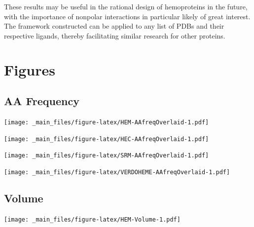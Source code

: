 \documentclass[a4paper, nobind]{templates/ociamthesis}
\let\origfigure\figure
\let\endorigfigure\endfigure
\renewenvironment{figure}[1][2] {
    \expandafter\origfigure\expandafter[H]
} {
    \endorigfigure
}
\begin{document}
These results may be useful in the rational design of hemoproteins in the future, with the importance of nonpolar interactions in particular likely of great interest. The framework constructed can be applied to any list of PDBs and their respective ligands, thereby facilitating similar research for other proteins.

\startappendices

\hypertarget{a-figures}{%
\chapter{Figures}\label{a-figures}}

\minitoc

\hypertarget{figs-aaFreqOverlaid}{%
\section{AA Frequency}\label{figs-aaFreqOverlaid}}

\begin{figure}
\centering
\texttt{[image: \_main\_files/figure-latex/HEM-AAfreqOverlaid-1.pdf]}
\caption{\label{fig:HEM-AAfreqOverlaid}HEM: AA Frequency}
\end{figure}

\begin{figure}
\centering
\texttt{[image: \_main\_files/figure-latex/HEC-AAfreqOverlaid-1.pdf]}
\caption{\label{fig:HEC-AAfreqOverlaid}HEC: AA Frequency}
\end{figure}

\begin{figure}
\centering
\texttt{[image: \_main\_files/figure-latex/SRM-AAfreqOverlaid-1.pdf]}
\caption{\label{fig:SRM-AAfreqOverlaid}SRM: AA Frequency}
\end{figure}

\begin{figure}
\centering
\texttt{[image: \_main\_files/figure-latex/VERDOHEME-AAfreqOverlaid-1.pdf]}
\caption{\label{fig:VERDOHEME-AAfreqOverlaid}VERDOHEME: AA Frequency}
\end{figure}

\hypertarget{figs-vol}{%
\section{Volume}\label{figs-vol}}

\begin{figure}
\centering
\texttt{[image: \_main\_files/figure-latex/HEM-Volume-1.pdf]}
\caption{\label{fig:HEM-Volume}HEM: Volume}
\end{figure}
\end{document}
